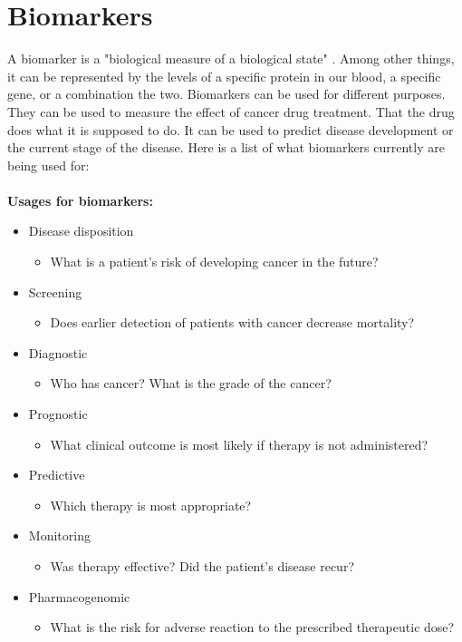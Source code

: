 \section{Biomarkers}
A biomarker is a "biological measure of a biological state"
\cite{biomarker1}. Among other things, it can be represented by the levels of
a specific protein in our blood, a specific gene, or a combination the two.
Biomarkers can be used for different purposes. They can be used to measure the
effect of cancer drug treatment. That the drug does what it is supposed to do.
It can be used to predict disease development or the current stage of the
disease. Here is a list of what biomarkers currently are being used for:
\\\\
\textbf{Usages for biomarkers:} \cite{beyondpsa}
\begin{itemize}
    \item Disease disposition
        \begin{itemize}
            \item What is a patient's risk of developing cancer in the future?
        \end{itemize}
    \item Screening
        \begin{itemize}
            \item Does earlier detection of patients with cancer decrease
                mortality?
        \end{itemize}
    \item Diagnostic
        \begin{itemize}
            \item Who has cancer? What is the grade of the cancer?
        \end{itemize}
    \item Prognostic
        \begin{itemize}
            \item What clinical outcome is most likely if therapy is not
                administered?
        \end{itemize}
    \item Predictive
        \begin{itemize}
            \item Which therapy is most appropriate?
        \end{itemize}
    \item Monitoring
        \begin{itemize}
            \item Was therapy effective? Did the patient's disease recur?
        \end{itemize}
    \item Pharmacogenomic
        \begin{itemize}
            \item What is the risk for adverse reaction to the prescribed
                therapeutic dose?
        \end{itemize}
\end{itemize}

